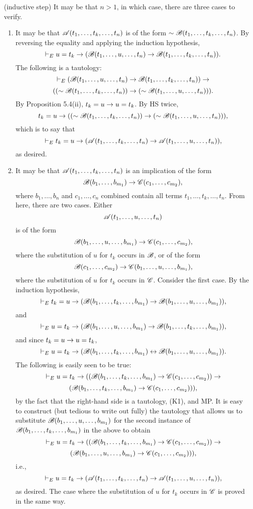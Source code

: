\begin{enumerate}
    (inductive step) It may be that \(n > 1\), in which case, there are three cases to verify.
    \begin{enumerate}
      \item It may be that \(\mathscr{A}(t_1, \dots, t_k, \dots, t_n)\) is of the form \(\sim\mathscr{B}(t_1, \dots, t_k, \dots, t_n)\). By reversing the equality and applying the induction hypothesis,
        \[\vdash_{E} u = t_k \rightarrow (\mathscr{B}(t_1, \dots, u, \dots, t_n) \rightarrow \mathscr{B}(t_1, \dots, t_k, \dots, t_n)).\]
        The following \wf{} is a tautology:
        \[\vdash_{E} (\mathscr{B}(t_1, \dots, u, \dots, t_n) \rightarrow \mathscr{B}(t_1, \dots, t_k, \dots, t_n)) \rightarrow\]
        \[((\sim\mathscr{B}(t_1, \dots, t_k, \dots, t_n)) \rightarrow (\sim\mathscr{B}(t_1, \dots, u, \dots, t_n))).\]
        By Proposition 5.4(ii), \(t_k = u \rightarrow u = t_k\). By HS twice,
        \[t_k = u \rightarrow ((\sim\mathscr{B}(t_1, \dots, t_k, \dots, t_n)) \rightarrow (\sim\mathscr{B}(t_1, \dots, u, \dots, t_n))),\]
        which is to say that
        \[\vdash_{E} t_k = u \rightarrow (\mathscr{A}(t_1, \dots, t_k, \dots, t_n) \rightarrow \mathscr{A}(t_1, \dots, u, \dots, t_n)),\]
        as desired.

      \item It may be that \(\mathscr{A}(t_1, \dots, t_k, \dots, t_n)\) is an implication of the form \[\mathscr{B}(b_1, \dots, b_{m_1}) \rightarrow \mathscr{C}(c_1, \dots, c_{m_2}),\]
        where \(b_1, \dots, b_n\) and \(c_1, \dots, c_n\) combined contain all terms \(t_1, \dots, t_k, \dots, t_n\). From here, there are two cases. Either
        \[\mathscr{A}(t_1, \dots, u, \dots, t_n)\]
        is of the form
        \[\mathscr{B}(b_1, \dots, u, \dots, b_{m_1}) \rightarrow \mathscr{C}(c_1, \dots, c_{m_2}),\]
        where the substitution of \(u\) for \(t_k\) occurs in \(\mathscr{B}\), or of the form
        \[\mathscr{B}(c_1, \dots, c_{m_2}) \rightarrow \mathscr{C}(b_1, \dots, u, \dots, b_{m_1}),\]
        where the substitution of \(u\) for \(t_k\) occurs in \(\mathscr{C}\). Consider the first case. By the induction hypothesis,
        \[\vdash_{E} t_k = u \rightarrow (\mathscr{B}(b_1, \dots, t_k, \dots, b_{m_1}) \rightarrow \mathscr{B}(b_1, \dots, u, \dots, b_{m_1})),\]
        and
        \[\vdash_{E} u = t_k \rightarrow (\mathscr{B}(b_1, \dots, u, \dots, b_{m_1}) \rightarrow \mathscr{B}(b_1, \dots, t_k, \dots, b_{m_1})),\]
        and since \(t_k = u \rightarrow u = t_k\),
        \[\vdash_{E} u = t_k \rightarrow (\mathscr{B}(b_1, \dots, t_k, \dots, b_{m_1}) \leftrightarrow \mathscr{B}(b_1, \dots, u, \dots, b_{m_1})).\]
        The following \wf{} is easily seen to be true:
        \[\vdash_{E} u = t_k \rightarrow ((\mathscr{B}(b_1, \dots, t_k, \dots, b_{m_1}) \rightarrow \mathscr{C}(c_1, \dots, c_{m_2})) \rightarrow\]
        \[(\mathscr{B}(b_1, \dots, t_k, \dots, b_{m_1}) \rightarrow \mathscr{C}(c_1, \dots, c_{m_2}))),\]
        by the fact that the right-hand side is a tautology, (K1), and MP. It is easy to construct (but tedious to write out fully) the tautology that allows us to substitute \(\mathscr{B}(b_1, \dots, u, \dots, b_{m_1})\) for the second instance of \(\mathscr{B}(b_1, \dots, t_k, \dots, b_{m_1})\) in the \wf{} above to obtain
        \[\vdash_{E} u = t_k \rightarrow ((\mathscr{B}(b_1, \dots, t_k, \dots, b_{m_1}) \rightarrow \mathscr{C}(c_1, \dots, c_{m_2})) \rightarrow\]
        \[(\mathscr{B}(b_1, \dots, u, \dots, b_{m_1}) \rightarrow \mathscr{C}(c_1, \dots, c_{m_2}))),\]
        i.e.,
        \[\vdash_{E} u = t_k \rightarrow (\mathscr{A}(t_1, \dots, t_k, \dots, t_{n}) \rightarrow \mathscr{A}(t_1, \dots, u, \dots, t_{n})),\]
        as desired. The case where the substitution of \(u\) for \(t_k\) occurs in \(\mathscr{C}\) is proved in the same way.


\end{enumerate}
\end{enumerate}
